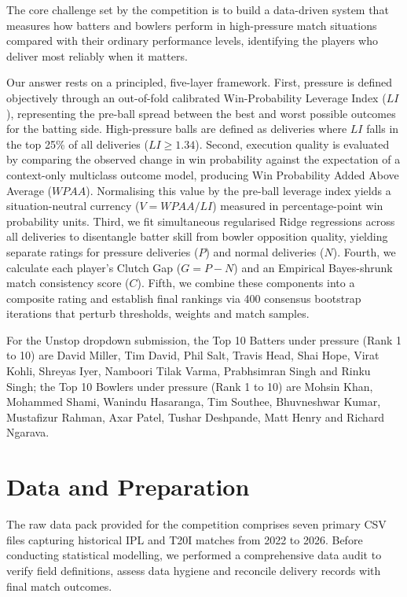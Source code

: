 \documentclass[11pt,a4paper]{article}
\begin{document}
The core challenge set by the competition is to build a data-driven system that measures how batters and bowlers perform in high-pressure match situations compared with their ordinary performance levels, identifying the players who deliver most reliably when it matters.

Our answer rests on a principled, five-layer framework. First, pressure is defined objectively through an out-of-fold calibrated Win-Probability Leverage Index ($LI$), representing the pre-ball spread between the best and worst possible outcomes for the batting side. High-pressure balls are defined as deliveries where $LI$ falls in the top 25\% of all deliveries ($LI \ge 1.34$). Second, execution quality is evaluated by comparing the observed change in win probability against the expectation of a context-only multiclass outcome model, producing Win Probability Added Above Average ($WPAA$). Normalising this value by the pre-ball leverage index yields a situation-neutral currency ($V = WPAA / LI$) measured in percentage-point win probability units. Third, we fit simultaneous regularised Ridge regressions across all deliveries to disentangle batter skill from bowler opposition quality, yielding separate ratings for pressure deliveries ($P$) and normal deliveries ($N$). Fourth, we calculate each player's Clutch Gap ($G = P - N$) and an Empirical Bayes-shrunk match consistency score ($C$). Fifth, we combine these components into a composite rating and establish final rankings via 400 consensus bootstrap iterations that perturb thresholds, weights and match samples.

For the Unstop dropdown submission, the Top 10 Batters under pressure (Rank 1 to 10) are David Miller, Tim David, Phil Salt, Travis Head, Shai Hope, Virat Kohli, Shreyas Iyer, Namboori Tilak Varma, Prabhsimran Singh and Rinku Singh; the Top 10 Bowlers under pressure (Rank 1 to 10) are Mohsin Khan, Mohammed Shami, Wanindu Hasaranga, Tim Southee, Bhuvneshwar Kumar, Mustafizur Rahman, Axar Patel, Tushar Deshpande, Matt Henry and Richard Ngarava.

\section{Data and Preparation}
\label{sec:data}

The raw data pack provided for the competition comprises seven primary CSV files capturing historical IPL and T20I matches from 2022 to 2026. Before conducting statistical modelling, we performed a comprehensive data audit to verify field definitions, assess data hygiene and reconcile delivery records with final match outcomes.
\end{document}
